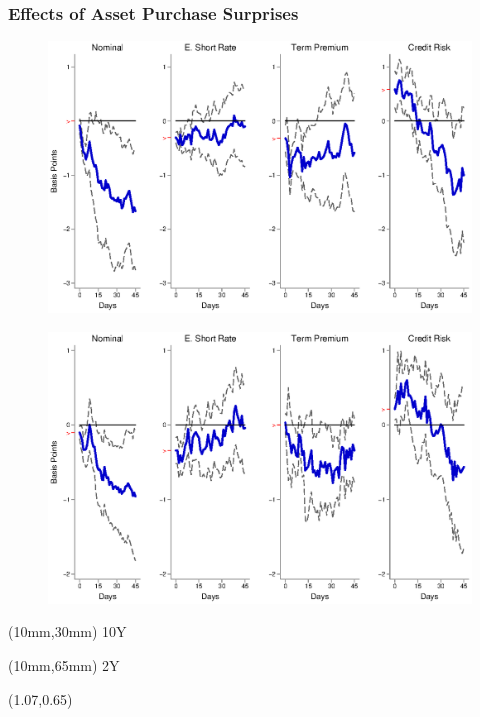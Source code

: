 \documentclass[12pt, aspectratio=169, xcolor=dvipsnames]{beamer}
\begin{document}
\begin{frame}[label=LSAPEM]
\frametitle{Effects of Asset Purchase Surprises}
\begin{figure}[!htbp]
\begin{center} %
\includegraphics[trim={0cm 0cm 0cm 0cm},clip,height=0.45\textheight,width=0.85\linewidth]{../Figures/LPs/LagDep-FX/LSAP/EM/LSAPEMnomyptpphi120m.eps}
\par\end{center}
\end{figure}
\vspace{-0.5cm}
\begin{figure}[!htbp]
\begin{center} %
\includegraphics[trim={0cm 0cm 0cm 0.76cm},clip,height=0.45\textheight,width=0.85\linewidth]{../Figures/LPs/LagDep-FX/LSAP/EM/LSAPEMnomyptpphi24m.eps}
\par\end{center}
\end{figure}
\begin{textblock*}{8mm}(10mm,30mm)
\small 10Y
\end{textblock*}
\begin{textblock*}{8mm}(10mm,65mm)
\small 2Y
\end{textblock*}
\begin{textblock*}{5cm}(1.07\textwidth,0.65\textheight)
\hyperlink{LSAPUS}{}
\end{textblock*}
\end{frame}
\end{document}
